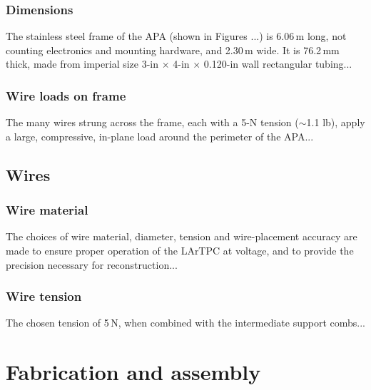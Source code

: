 

\subsubsection{Dimensions}
\label{sec:apa-frame-dim}

The stainless steel frame of the APA (shown in Figures ...) is 6.06\,m long, not counting electronics and mounting hardware, and 2.30\,m wide.  It is 76.2\,mm thick, made from imperial size 3-in $\times$ 4-in $\times$ 0.120-in wall rectangular tubing... 

\subsubsection{Wire loads on frame}

The many wires strung across the frame, each with a 5-N tension ($\sim$1.1 lb), apply a large, compressive, in-plane load around the perimeter of the APA...


\subsection{Wires}
\label{sec:apa-wires}


\subsubsection{Wire material}
\label{sec:apa-wires-mat}

The choices of wire material, diameter, tension and wire-placement accuracy are made to ensure proper operation of the LArTPC at voltage, and to provide the precision necessary for reconstruction...

\subsubsection{Wire tension}
\label{sec:apa-wires-tension}

The chosen tension of 5\,N, when combined with the intermediate support combs...
 
\section{Fabrication and assembly}
\label{sec:apa-fabrication}

